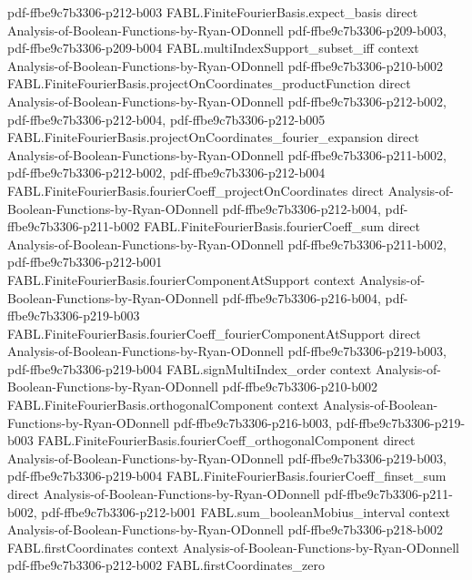 \begin{theorem}
{    pdf-ffbe9c7b3306-p212-b003}
\proofstep
  {FABL.FiniteFourierBasis.expect_basis}
  {direct}
  {Analysis-of-Boolean-Functions-by-Ryan-ODonnell}
  {pdf-ffbe9c7b3306-p209-b003,
    pdf-ffbe9c7b3306-p209-b004}
\proofstep
  {FABL.multiIndexSupport_subset_iff}
  {context}
  {Analysis-of-Boolean-Functions-by-Ryan-ODonnell}
  {pdf-ffbe9c7b3306-p210-b002}
\proofstep
  {FABL.FiniteFourierBasis.projectOnCoordinates_productFunction}
  {direct}
  {Analysis-of-Boolean-Functions-by-Ryan-ODonnell}
  {pdf-ffbe9c7b3306-p212-b002,
    pdf-ffbe9c7b3306-p212-b004,
    pdf-ffbe9c7b3306-p212-b005}
\proofstep
  {FABL.FiniteFourierBasis.projectOnCoordinates_fourier_expansion}
  {direct}
  {Analysis-of-Boolean-Functions-by-Ryan-ODonnell}
  {pdf-ffbe9c7b3306-p211-b002,
    pdf-ffbe9c7b3306-p212-b002,
    pdf-ffbe9c7b3306-p212-b004}
\proofstep
  {FABL.FiniteFourierBasis.fourierCoeff_projectOnCoordinates}
  {direct}
  {Analysis-of-Boolean-Functions-by-Ryan-ODonnell}
  {pdf-ffbe9c7b3306-p212-b004,
    pdf-ffbe9c7b3306-p211-b002}
\proofstep
  {FABL.FiniteFourierBasis.fourierCoeff_sum}
  {direct}
  {Analysis-of-Boolean-Functions-by-Ryan-ODonnell}
  {pdf-ffbe9c7b3306-p211-b002,
    pdf-ffbe9c7b3306-p212-b001}
\proofstep
  {FABL.FiniteFourierBasis.fourierComponentAtSupport}
  {context}
  {Analysis-of-Boolean-Functions-by-Ryan-ODonnell}
  {pdf-ffbe9c7b3306-p216-b004,
    pdf-ffbe9c7b3306-p219-b003}
\proofstep
  {FABL.FiniteFourierBasis.fourierCoeff_fourierComponentAtSupport}
  {direct}
  {Analysis-of-Boolean-Functions-by-Ryan-ODonnell}
  {pdf-ffbe9c7b3306-p219-b003,
    pdf-ffbe9c7b3306-p219-b004}
\proofstep
  {FABL.signMultiIndex_order}
  {context}
  {Analysis-of-Boolean-Functions-by-Ryan-ODonnell}
  {pdf-ffbe9c7b3306-p210-b002}
\proofstep
  {FABL.FiniteFourierBasis.orthogonalComponent}
  {context}
  {Analysis-of-Boolean-Functions-by-Ryan-ODonnell}
  {pdf-ffbe9c7b3306-p216-b003,
    pdf-ffbe9c7b3306-p219-b003}
\proofstep
  {FABL.FiniteFourierBasis.fourierCoeff_orthogonalComponent}
  {direct}
  {Analysis-of-Boolean-Functions-by-Ryan-ODonnell}
  {pdf-ffbe9c7b3306-p219-b003,
    pdf-ffbe9c7b3306-p219-b004}
\proofstep
  {FABL.FiniteFourierBasis.fourierCoeff_finset_sum}
  {direct}
  {Analysis-of-Boolean-Functions-by-Ryan-ODonnell}
  {pdf-ffbe9c7b3306-p211-b002,
    pdf-ffbe9c7b3306-p212-b001}
\proofstep
  {FABL.sum_booleanMobius_interval}
  {context}
  {Analysis-of-Boolean-Functions-by-Ryan-ODonnell}
  {pdf-ffbe9c7b3306-p218-b002}
\proofstep
  {FABL.firstCoordinates}
  {context}
  {Analysis-of-Boolean-Functions-by-Ryan-ODonnell}
  {pdf-ffbe9c7b3306-p212-b002}
\proofstep
  {FABL.firstCoordinates_zero}

\end{theorem}
